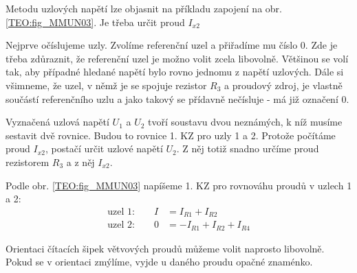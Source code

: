 {      Metodu uzlových napětí lze objasnit na příkladu zapojení na obr. \ref{TEO:fig_MMUN03}. Je
      třeba určit proud $I_{x2}$ 
          
      Nejprve očíslujeme uzly. Zvolíme referenční uzel a přiřadíme mu číslo 0. Zde je třeba  
      zdůraznit, že referenční uzel je možno volit zcela libovolně. Většinou se volí tak, aby 
      případné hledané napětí bylo rovno jednomu z napětí uzlových. Dále si všimneme, že uzel, v 
      němž je se spojuje rezistor $R_3$ a proudový zdroj, je vlastně součástí referenčního uzlu a 
      jako takový se přídavně nečísluje - má již označení 0.
      
      Vyznačená uzlová napětí $U_1$ a $U_2$ tvoří soustavu dvou neznámých, k níž musíme sestavit 
      dvě rovnice. Budou to rovnice 1. KZ pro uzly 1 a 2. Protože počítáme proud $I_{x2}$, postačí 
      určit uzlové napětí $U_2$. Z něj totiž snadno určíme proud rezistorem $R_3$ a z něj $I_{x2}$.
      
      Podle obr. \ref{TEO:fig_MMUN03} napíšeme 1. KZ pro rovnováhu proudů v uzlech 1 a 2:
      \begin{align*}
        \text{uzel 1:} \qquad I &=  I_{R1} + I_{R2}            \\
        \text{uzel 2:} \qquad 0 &= -I_{R1} + I_{R2} + I_{R4}  
      \end{align*}
      
      Orientaci čítacích šipek větvových proudů můžeme volit naprosto libovolně. Pokud se v 
      orientaci zmýlíme, vyjde u daného proudu opačné znaménko.
      
}
